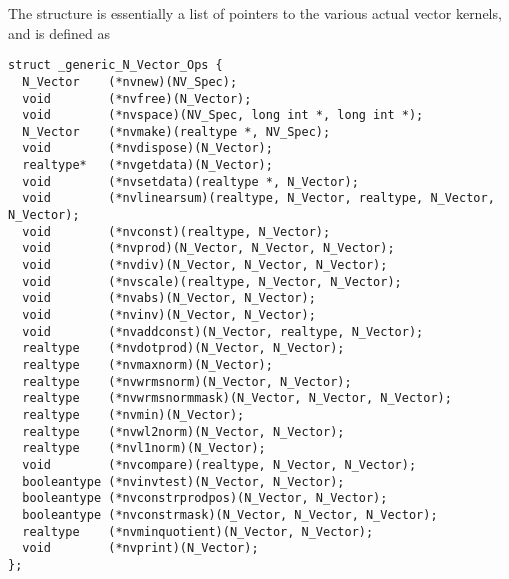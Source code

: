 The  structure is essentially a list of pointers to
the various actual vector kernels, and is defined as
\begin{verbatim}
struct _generic_N_Vector_Ops {
  N_Vector    (*nvnew)(NV_Spec);
  void        (*nvfree)(N_Vector);
  void        (*nvspace)(NV_Spec, long int *, long int *);
  N_Vector    (*nvmake)(realtype *, NV_Spec);
  void        (*nvdispose)(N_Vector);
  realtype*   (*nvgetdata)(N_Vector);
  void        (*nvsetdata)(realtype *, N_Vector);
  void        (*nvlinearsum)(realtype, N_Vector, realtype, N_Vector, N_Vector); 
  void        (*nvconst)(realtype, N_Vector);
  void        (*nvprod)(N_Vector, N_Vector, N_Vector);
  void        (*nvdiv)(N_Vector, N_Vector, N_Vector);
  void        (*nvscale)(realtype, N_Vector, N_Vector);
  void        (*nvabs)(N_Vector, N_Vector);
  void        (*nvinv)(N_Vector, N_Vector);
  void        (*nvaddconst)(N_Vector, realtype, N_Vector);
  realtype    (*nvdotprod)(N_Vector, N_Vector);
  realtype    (*nvmaxnorm)(N_Vector);
  realtype    (*nvwrmsnorm)(N_Vector, N_Vector);
  realtype    (*nvwrmsnormmask)(N_Vector, N_Vector, N_Vector);
  realtype    (*nvmin)(N_Vector);
  realtype    (*nvwl2norm)(N_Vector, N_Vector);
  realtype    (*nvl1norm)(N_Vector);
  void        (*nvcompare)(realtype, N_Vector, N_Vector);
  booleantype (*nvinvtest)(N_Vector, N_Vector);
  booleantype (*nvconstrprodpos)(N_Vector, N_Vector);
  booleantype (*nvconstrmask)(N_Vector, N_Vector, N_Vector);
  realtype    (*nvminquotient)(N_Vector, N_Vector);
  void        (*nvprint)(N_Vector);
};
\end{verbatim}

